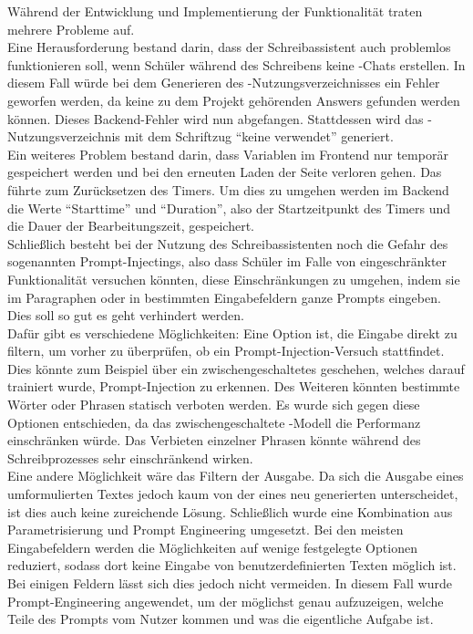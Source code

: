 \documentclass[../main.tex]{subfiles}
\begin{document}
Während der Entwicklung und Implementierung der Funktionalität traten mehrere Probleme auf.\\
Eine Herausforderung bestand darin, dass der Schreibassistent auch problemlos funktionieren soll, wenn Schüler während des Schreibens keine -Chats erstellen. In diesem Fall würde 
bei dem Generieren des -Nutzungsverzeichnisses ein Fehler geworfen werden, da keine zu dem Projekt gehörenden Answers gefunden werden können. Dieses Backend-Fehler wird nun 
abgefangen. Stattdessen wird  das -Nutzungsverzeichnis mit dem Schriftzug "`keine  verwendet"' generiert.\\
Ein weiteres Problem bestand darin, dass Variablen im Frontend nur temporär gespeichert werden und bei den erneuten Laden der Seite verloren gehen. Das führte zum Zurücksetzen des 
Timers. Um dies zu umgehen werden im Backend die Werte "`Starttime"' und "`Duration"', also der Startzeitpunkt des Timers und die Dauer der Bearbeitungszeit, gespeichert.\\ 
Schließlich besteht bei der Nutzung des Schreibassistenten noch die Gefahr des sogenannten Prompt-Injectings, also dass Schüler im Falle von eingeschränkter Funktionalität versuchen 
könnten, diese Einschränkungen zu umgehen, indem sie im Paragraphen oder in bestimmten Eingabefeldern ganze Prompts eingeben. Dies soll so gut es geht verhindert werden.\\ 
Dafür gibt es verschiedene Möglichkeiten: Eine Option ist, die Eingabe direkt zu filtern, um vorher zu überprüfen, ob ein Prompt-Injection-Versuch stattfindet. Dies könnte zum Beispiel 
über ein zwischengeschaltetes  geschehen, welches darauf trainiert wurde, Prompt-Injection zu erkennen. Des Weiteren könnten bestimmte Wörter oder Phrasen statisch verboten werden. 
Es wurde sich gegen diese Optionen entschieden, da das zwischengeschaltete -Modell die Performanz einschränken würde. Das Verbieten einzelner Phrasen könnte während des 
Schreibprozesses sehr einschränkend wirken.\cite{promptinjection}\\
Eine andere Möglichkeit wäre das Filtern der Ausgabe. Da sich die Ausgabe eines umformulierten Textes jedoch kaum von der eines neu generierten unterscheidet, ist dies auch keine 
zureichende Lösung. Schließlich wurde eine Kombination aus Parametrisierung und Prompt Engineering umgesetzt. Bei den meisten Eingabefeldern werden die Möglichkeiten auf wenige 
festgelegte Optionen reduziert, sodass dort keine Eingabe von benutzerdefinierten Texten möglich ist. Bei einigen Feldern lässt sich dies jedoch nicht vermeiden. In diesem Fall wurde 
Prompt-Engineering angewendet, um der  möglichst genau aufzuzeigen, welche Teile des Prompts vom Nutzer kommen und was die eigentliche Aufgabe ist.\\
\end{document}
